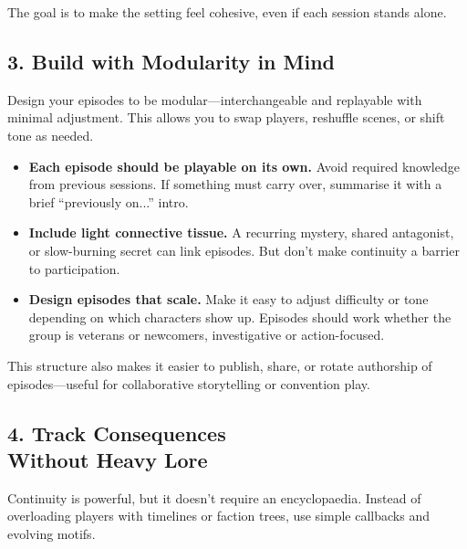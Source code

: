 The goal is to make the setting feel cohesive, even if each session stands alone.

\subsection*{3. Build with Modularity in Mind}

Design your episodes to be modular—interchangeable and replayable with minimal adjustment. This allows you to swap players, reshuffle scenes, or shift tone as needed.

\begin{itemize}
    \item \textbf{Each episode should be playable on its own.} Avoid required knowledge from previous sessions. If something must carry over, summarise it with a brief “previously on...” intro.

    \item \textbf{Include light connective tissue.} A recurring mystery, shared antagonist, or slow-burning secret can link episodes. But don’t make continuity a barrier to participation.

    \item \textbf{Design episodes that scale.} Make it easy to adjust difficulty or tone depending on which characters show up. Episodes should work whether the group is veterans or newcomers, investigative or action-focused.
\end{itemize}

This structure also makes it easier to publish, share, or rotate authorship of episodes—useful for collaborative storytelling or convention play.

\subsection*{4. Track Consequences\\ Without Heavy Lore}

Continuity is powerful, but it doesn’t require an encyclopaedia. Instead of overloading players with timelines or faction trees, use simple callbacks and evolving motifs.

